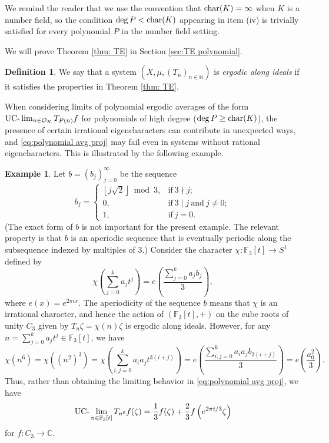 \documentclass{amsart}
\theoremstyle{definition}
\newtheorem{definition}[theorem]{Definition}
\newtheorem{example}[theorem]{Example}
\numberwithin{equation}{section}
\newcommand{\N}{\mathbb{N}}
\newcommand{\C}{\mathbb{C}}
\newcommand{\F}{\mathbb{F}}
\newcommand{\mO}{\mathcal{O}}
\newcommand{\floor}[1]{\left\lfloor #1 \right\rfloor}
\newcommand{\UClim}{\textup{UC-}\lim}
\begin{document}
We remind the reader that we use the convention that $\textup{char}(K) = \infty$ when $K$ is a number field, so the condition $\deg{P} < \textup{char}(K)$ appearing in item (iv) is trivially satisfied for every polynomial $P$ in the number field setting.

We will prove Theorem \ref{thm: TE} in Section \ref{sec:TE polynomial}.

\begin{definition} \label{defn: TE}
    We say that a system $(X, \mu, (T_n)_{n \in \N})$ is \emph{ergodic along ideals} if it satisfies the properties in Theorem \ref{thm: TE}.
\end{definition}

When considering limits of polynomial ergodic averages of the form $\UClim_{n \in \mO_K} T_{P(n)}f$ for polynomials of high degree ($\deg{P} \ge \textup{char}(K)$), the presence of certain irrational eigencharacters can contribute in unexpected ways, and \eqref{eq:polynomial avg proj} may fail even in systems without rational eigencharacters.
This is illustrated by the following example.

\begin{example} \label{eg: weakly rational}
    Let $b = (b_j)_{j=0}^{\infty}$ be the sequence
    \begin{equation*}
        b_j = \begin{cases}
            \floor{j\sqrt{2}} \bmod{3}, & \text{if}~3 \nmid j; \\
            0, & \text{if}~3 \mid j~\text{and}~j \ne 0; \\
            1, & \text{if}~j = 0.
        \end{cases}
    \end{equation*}
    (The exact form of $b$ is not important for the present example.
    The relevant property is that $b$ is an aperiodic sequence that is eventually periodic along the subsequence indexed by multiples of $3$.)
    Consider the character $\chi : \F_3[t] \to S^1$ defined by
    \begin{equation*}
        \chi \left( \sum_{j=0}^k a_j t^j \right) = e \left( \frac{\sum_{j=0}^k a_jb_j}{3} \right),
    \end{equation*}
    where $e(x) = e^{2\pi ix}$.
    The aperiodicity of the sequence $b$ means that $\chi$ is an irrational character, and hence the action of $(\F_3[t],+)$ on the cube roots of unity $C_3$ given by $T_n \zeta = \chi(n)\zeta$ is ergodic along ideals.
    However, for any $n = \sum_{j=0}^k a_jt^j \in \F_3[t]$, we have
    \begin{equation*}
        \chi(n^{6}) = \chi \left( (n^2)^3 \right) = \chi \left( \sum_{i,j=0}^k a_i a_j t^{3(i+j)} \right) = e \left( \frac{\sum_{i,j=0}^k a_i a_j b_{3(i+j)}}{3} \right) = e \left( \frac{a_0^2}{3} \right).
    \end{equation*}
    Thus, rather than obtaining the limiting behavior in \eqref{eq:polynomial avg proj}, we have
    \begin{equation*}
        \UClim_{n \in \F_3[t]} T_{n^6}f(\zeta) = \frac{1}{3} f(\zeta) + \frac{2}{3} f \left( e^{2\pi i/3} \zeta \right)
    \end{equation*}
    for $f : C_3 \to \C$.
\end{example}
\end{document}
